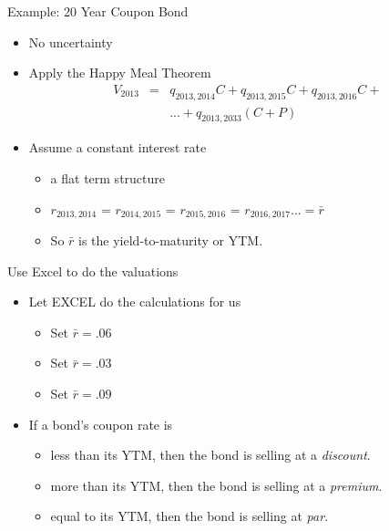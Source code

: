 \documentclass[professionalfonts,small]{beamer}
\begin{document}
\begin{frame}{Example: 20 Year Coupon Bond}
\footnotesize

\begin{itemize}

\item No uncertainty

\medskip

\item Apply the Happy Meal Theorem
\begin{eqnarray*}
V_{2013} &=& q_{2013,2014} C + q_{2013,2015} C + q_{2013,2016} C +  \\
    && ... + q_{2013,2033} ( C + P)
\end{eqnarray*}

\medskip

\item Assume a constant interest rate
\begin{itemize}

\footnotesize

\item a flat term structure

\smallskip

\item $r_{2013,2014}$ = $r_{2014,2015}$ = $r_{2015,2016}$ = $r_{2016,2017} ... = \bar{r} $

\smallskip


\item So $\bar{r}$ is the yield-to-maturity or YTM.
\end{itemize}

\end{itemize}

\end{frame}

\begin{frame}{Use Excel to do the valuations}

\begin{itemize}

\item Let EXCEL do the calculations for us
\begin{itemize}
\item Set $\bar{r}=.06$

\item Set $\bar{r}=.03$

\item Set $\bar{r} =.09$
\end{itemize}

\medskip

\item If a bond's coupon rate is
\begin{itemize}
\item less than its YTM, then the bond is selling at a {\em discount}.
\item more than its YTM, then the bond is selling at a {\em premium}.
\item equal to its YTM, then the bond is selling at {\em par}.
\end{itemize}

\end{itemize}

\end{frame}
\end{document}
